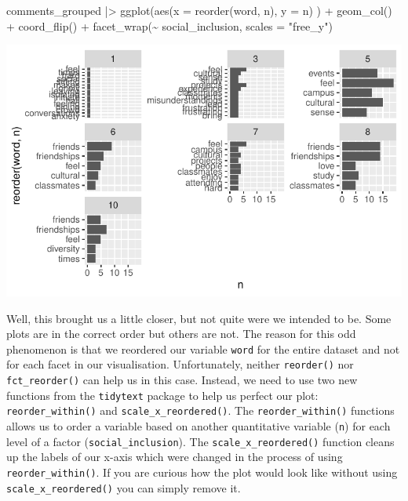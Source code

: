 \documentclass[
  letterpaper,
  DIV=11,
  numbers=noendperiod]{scrreprt}
\newenvironment{Shaded}{\begin{snugshade}}{\end{snugshade}}
\newcommand{\AttributeTok}[1]{\textcolor[rgb]{0.40,0.45,0.13}{#1}}
\newcommand{\FunctionTok}[1]{\textcolor[rgb]{0.28,0.35,0.67}{#1}}
\newcommand{\NormalTok}[1]{\textcolor[rgb]{0.00,0.23,0.31}{#1}}
\newcommand{\SpecialCharTok}[1]{\textcolor[rgb]{0.37,0.37,0.37}{#1}}
\newcommand{\StringTok}[1]{\textcolor[rgb]{0.13,0.47,0.30}{#1}}
\begin{document}
\begin{Shaded}
\begin{Highlighting}[]
\NormalTok{comments\_grouped }\SpecialCharTok{|\textgreater{}}
  \FunctionTok{ggplot}\NormalTok{(}\FunctionTok{aes}\NormalTok{(}\AttributeTok{x =} \FunctionTok{reorder}\NormalTok{(word, n),}
             \AttributeTok{y =}\NormalTok{ n)}
\NormalTok{         ) }\SpecialCharTok{+}
  \FunctionTok{geom\_col}\NormalTok{() }\SpecialCharTok{+}
  \FunctionTok{coord\_flip}\NormalTok{() }\SpecialCharTok{+}
  \FunctionTok{facet\_wrap}\NormalTok{(}\SpecialCharTok{\textasciitilde{}}\NormalTok{ social\_inclusion,}
             \AttributeTok{scales =} \StringTok{"free\_y"}\NormalTok{)}
\end{Highlighting}
\end{Shaded}

\includegraphics{14_mixed_methods_files/figure-pdf/visualise-social-inclusion-groups-words-n-03-1.pdf}

Well, this brought us a little closer, but not quite were we intended to
be. Some plots are in the correct order but others are not. The reason
for this odd phenomenon is that we reordered our variable \texttt{word}
for the entire dataset and not for each facet in our visualisation.
Unfortunately, neither \texttt{reorder()} nor \texttt{fct\_reorder()}
can help us in this case. Instead, we need to use two new functions from
the \texttt{tidytext} package to help us perfect our plot:
\texttt{reorder\_within()} and \texttt{scale\_x\_reordered()}. The
\texttt{reorder\_within()} functions allows us to order a variable based
on another quantitative variable (\texttt{n}) for each level of a factor
(\texttt{social\_inclusion}). The \texttt{scale\_x\_reordered()}
function cleans up the labels of our x-axis which were changed in the
process of using \texttt{reorder\_within()}. If you are curious how the
plot would look like without using \texttt{scale\_x\_reordered()} you
can simply remove it.
\end{document}
